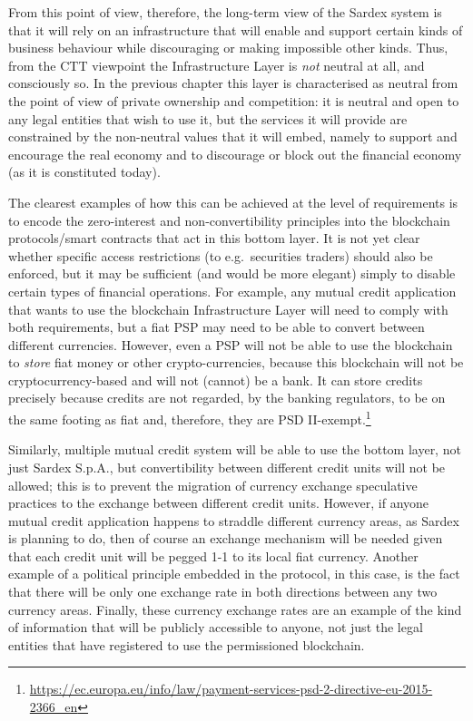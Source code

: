 From this point of view, therefore, the long-term view of the Sardex system is that it will rely on an infrastructure that will enable and support certain kinds of business behaviour while discouraging or making impossible other kinds. Thus, from the CTT viewpoint the Infrastructure Layer is \emph{not} neutral at all, and consciously so. In the previous chapter this layer is characterised as neutral from the point of view of private ownership and competition: it is neutral and open to any legal entities that wish to use it, but the services it will provide are constrained by the non-neutral values that it will embed, namely to support and encourage the real economy and to discourage or block out the financial economy (as it is constituted today).

The clearest examples of how this can be achieved at the level of requirements is to encode the zero-interest and non-convertibility principles into the blockchain protocols/smart contracts that act in this bottom layer. It is not yet clear whether specific access restrictions (to e.g.\ securities traders) should also be enforced, but it may be sufficient (and would be more elegant) simply to disable certain types of financial operations. For example, any mutual credit application that wants to use the blockchain Infrastructure Layer will need to comply with both requirements, but a fiat PSP may need to be able to convert between different currencies. However, even a PSP will not be able to use the blockchain to \emph{store} fiat money or other crypto-currencies, because this blockchain will not be cryptocurrency-based and will not (cannot) be a bank. It can store credits precisely because credits are not regarded, by the banking regulators, to be on the same footing as fiat and, therefore, they are PSD II-exempt.\footnote{\url{https://ec.europa.eu/info/law/payment-services-psd-2-directive-eu-2015-2366_en}}

Similarly, multiple mutual credit system will be able to use the bottom layer, not just Sardex S.p.A., but convertibility between different credit units will not be allowed; this is to prevent the migration of currency exchange speculative practices to the exchange between different credit units. However, if anyone mutual credit application happens to straddle different currency areas, as Sardex is planning to do, then of course an exchange mechanism will be needed given that each credit unit will be pegged 1-1 to its local fiat currency. Another example of a political principle embedded in the protocol, in this case, is the fact that there will be only one exchange rate in both directions between any two currency areas. Finally, these currency exchange rates are an example of the kind of information that will be publicly accessible to anyone, not just the legal entities that have registered to use the permissioned blockchain.

